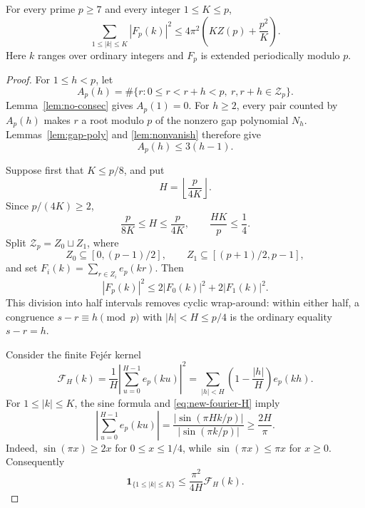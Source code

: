 \begin{lemma}
\label{lem:fourier-nonconcentration}
For every prime \(p\ge7\) and every integer \(1\le K\le p\),
\[
 \sum_{1\le |k|\le K}|F_p(k)|^2
 \le
 4\pi^2\left(KZ(p)+\frac{p^2}{K}\right).
\]
Here \(k\) ranges over ordinary integers and \(F_p\) is extended
periodically modulo \(p\).
\end{lemma}

\begin{proof}
For \(1\le h<p\), let
\[
 A_p(h)
 =\#\{r:0\le r<r+h<p,\ r,r+h\in\mathcal Z_p\}.
\]
Lemma~\ref{lem:no-consec} gives \(A_p(1)=0\).  For \(h\ge2\),
every pair counted by \(A_p(h)\) makes \(r\) a root modulo \(p\) of
the nonzero gap polynomial \(N_h\).  Lemmas~\ref{lem:gap-poly} and
\ref{lem:nonvanish} therefore give
\begin{equation}
 A_p(h)\le3(h-1).
 \label{eq:new-fourier-gap}
\end{equation}

Suppose first that \(K\le p/8\), and put
\[
 H=\left\lfloor\frac{p}{4K}\right\rfloor.
\]
Since \(p/(4K)\ge2\),
\begin{equation}
 \frac{p}{8K}\le H\le\frac{p}{4K},
 \qquad \frac{HK}{p}\le\frac14.
 \label{eq:new-fourier-H}
\end{equation}
Split \(\mathcal Z_p=Z_0\sqcup Z_1\), where
\[
 Z_0\subseteq[0,(p-1)/2],
 \qquad
 Z_1\subseteq[(p+1)/2,p-1],
\]
and set \(F_i(k)=\sum_{r\in Z_i}e_p(kr)\).  Then
\begin{equation}
 |F_p(k)|^2\le2|F_0(k)|^2+2|F_1(k)|^2.
 \label{eq:new-fourier-halves}
\end{equation}
This division into half intervals removes cyclic wrap-around: within
either half, a congruence \(s-r\equiv h\pmod p\) with
\(|h|<H\le p/4\) is the ordinary equality \(s-r=h\).

Consider the finite Fej\'er kernel
\[
 \mathcal F_H(k)
 =\frac1H\left|\sum_{u=0}^{H-1}e_p(ku)\right|^2
 =\sum_{|h|<H}
 \left(1-\frac{|h|}{H}\right)e_p(kh).
\]
For \(1\le|k|\le K\), the sine formula and
\eqref{eq:new-fourier-H} imply
\[
 \left|\sum_{u=0}^{H-1}e_p(ku)\right|
 =\frac{|\sin(\pi Hk/p)|}{|\sin(\pi k/p)|}
 \ge\frac{2H}{\pi}.
\]
Indeed, \(\sin(\pi x)\ge2x\) for \(0\le x\le1/4\), while
\(\sin(\pi x)\le\pi x\) for \(x\ge0\).  Consequently
\begin{equation}
 \mathbf1_{\{1\le|k|\le K\}}
 \le\frac{\pi^2}{4H}\mathcal F_H(k).
 \label{eq:new-fourier-majorant}
\end{equation}


\end{proof}
